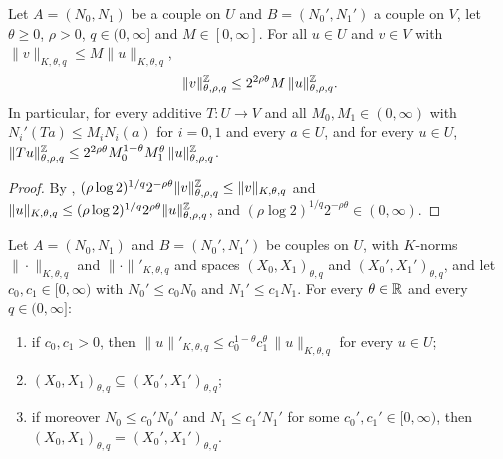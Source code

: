 \begin{corollary}
\label{cor:interpolation-property-discrete}
\leanok
{}
Let $A = (N_0, N_1)$ be a couple on $U$ and $B = (N_0', N_1')$ a couple on $V$, let
$\theta \geq 0$, $\rho > 0$,
$q \in (0, \infty]$ and $M \in [0, \infty]$. For all $u \in U$ and $v \in V$ with
$\|v\|_{K, \theta, q} \leq M \|u\|_{K, \theta, q}$,
\[
  \|v\|^{\mathbb{Z}}_{\theta, \rho, q} \leq 2^{2\rho\theta} M \, \|u\|^{\mathbb{Z}}_{\theta, \rho, q} .
\]
In particular, for every additive $T : U \to V$ and all $M_0, M_1 \in (0, \infty)$ with
$N_i'(Ta) \leq M_i N_i(a)$ for $i = 0, 1$ and every $a \in U$, and for every $u \in U$,
$\|Tu\|^{\mathbb{Z}}_{\theta, \rho, q} \leq 2^{2\rho\theta} M_0^{1-\theta} M_1^{\theta} \,
\|u\|^{\mathbb{Z}}_{\theta, \rho, q}$.
\end{corollary}

\begin{proof}
\leanok
By ,
$(\rho \log 2)^{1/q} 2^{-\rho\theta} \|v\|^{\mathbb{Z}}_{\theta, \rho, q} \leq \|v\|_{K, \theta, q}$ and
$\|u\|_{K, \theta, q} \leq (\rho \log 2)^{1/q} 2^{\rho\theta} \|u\|^{\mathbb{Z}}_{\theta, \rho, q}$, and
$(\rho \log 2)^{1/q} 2^{-\rho\theta} \in (0, \infty)$.
\end{proof}

\begin{corollary}
\label{cor:comparable-couples}
\leanok
{}
Let $A = (N_0, N_1)$ and $B = (N_0', N_1')$ be couples on $U$, with $K$-norms
$\|\cdot\|_{K, \theta, q}$ and $\|\cdot\|'_{K, \theta, q}$ and spaces $(X_0, X_1)_{\theta, q}$
and $(X_0', X_1')_{\theta, q}$, and let $c_0, c_1 \in [0, \infty)$ with $N_0' \leq c_0 N_0$ and
$N_1' \leq c_1 N_1$. For every $\theta \in \mathbb{R}$ and every $q \in (0, \infty]$:
\begin{enumerate}
  \item if $c_0, c_1 > 0$, then
    $\|u\|'_{K, \theta, q} \leq c_0^{1-\theta} c_1^{\theta} \, \|u\|_{K, \theta, q}$ for every
    $u \in U$;
  \item $(X_0, X_1)_{\theta, q} \subseteq (X_0', X_1')_{\theta, q}$;
  \item if moreover $N_0 \leq c_0' N_0'$ and $N_1 \leq c_1' N_1'$ for some
    $c_0', c_1' \in [0, \infty)$, then $(X_0, X_1)_{\theta, q} = (X_0', X_1')_{\theta, q}$.
\end{enumerate}
\end{corollary}

